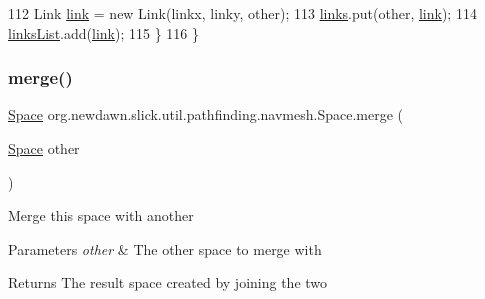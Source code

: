 \begin{DoxyCode}
112             Link \mbox{\hyperlink{classorg_1_1newdawn_1_1slick_1_1util_1_1pathfinding_1_1navmesh_1_1_space_aef276d96a286583f4d5bdb55a051ddb5}{link}} = \textcolor{keyword}{new} Link(linkx, linky, other);
113             \mbox{\hyperlink{classorg_1_1newdawn_1_1slick_1_1util_1_1pathfinding_1_1navmesh_1_1_space_aa9edbad1ad11ced12f9a5a5b73b50a9f}{links}}.put(other, \mbox{\hyperlink{classorg_1_1newdawn_1_1slick_1_1util_1_1pathfinding_1_1navmesh_1_1_space_aef276d96a286583f4d5bdb55a051ddb5}{link}});
114             \mbox{\hyperlink{classorg_1_1newdawn_1_1slick_1_1util_1_1pathfinding_1_1navmesh_1_1_space_ab8ed6f02eb154ea33c907a3dda0b92db}{linksList}}.add(\mbox{\hyperlink{classorg_1_1newdawn_1_1slick_1_1util_1_1pathfinding_1_1navmesh_1_1_space_aef276d96a286583f4d5bdb55a051ddb5}{link}});
115         \}       
116     \}
\end{DoxyCode}
\mbox{\label{classorg_1_1newdawn_1_1slick_1_1util_1_1pathfinding_1_1navmesh_1_1_space_a7ce4bd7e02ab60937294a6716076a900}} 
\subsubsection{\texorpdfstring{merge()}{merge()}}
{\footnotesize\ttfamily \mbox{\hyperlink{classorg_1_1newdawn_1_1slick_1_1util_1_1pathfinding_1_1navmesh_1_1_space}{Space}} org.\+newdawn.\+slick.\+util.\+pathfinding.\+navmesh.\+Space.\+merge (\begin{DoxyParamCaption}\item[{\mbox{\hyperlink{classorg_1_1newdawn_1_1slick_1_1util_1_1pathfinding_1_1navmesh_1_1_space}{Space}}}]{other }\end{DoxyParamCaption})\hspace{0.3cm}{\ttfamily [inline]}}

Merge this space with another


\begin{DoxyParams}{Parameters}
{\em other} & The other space to merge with \\
\hline
\end{DoxyParams}
\begin{DoxyReturn}{Returns}
The result space created by joining the two 
\end{DoxyReturn}


